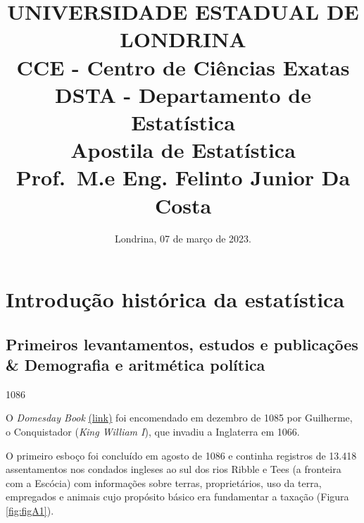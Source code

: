 \documentclass[
]{book}
\title{UNIVERSIDADE ESTADUAL DE LONDRINA\\
CCE - Centro de Ciências Exatas\\
DSTA - Departamento de Estatística\\
Apostila de Estatística\\
Prof.~M.e Eng. Felinto Junior Da Costa}
\author{}
\date{\vspace{-2.5em}Londrina, 07 de março de 2023.}
\begin{document}
\maketitle

{
\setcounter{tocdepth}{1}
\tableofcontents
}
\hypertarget{section}{%
\chapter*{}\label{section}}

\hypertarget{introduuxe7uxe3o-histuxf3rica-da-estatuxedstica}{%
\chapter{Introdução histórica da estatística}\label{introduuxe7uxe3o-histuxf3rica-da-estatuxedstica}}

\hypertarget{primeiros-levantamentos-estudos-e-publicauxe7uxf5es-demografia-e-aritmuxe9tica-poluxedtica}{%
\section{Primeiros levantamentos, estudos e publicações \& Demografia e aritmética política}\label{primeiros-levantamentos-estudos-e-publicauxe7uxf5es-demografia-e-aritmuxe9tica-poluxedtica}}

1086

\hfill\break

O \emph{Domesday Book} \href{http://www.nationalarchives.gov.uk/education/resources/domesday-book/}{(link)}
foi encomendado em dezembro de 1085 por Guilherme, o Conquistador (\emph{King William I}), que invadiu a Inglaterra em 1066.

O primeiro esboço foi concluído em agosto de 1086 e continha registros de 13.418 assentamentos nos condados ingleses ao sul dos rios Ribble e Tees (a fronteira com a Escócia) com informações sobre terras, proprietários, uso da terra, empregados e animais cujo propósito básico era fundamentar a taxação (Figura \ref{fig:figA1}).

\hfill\break
\end{document}
